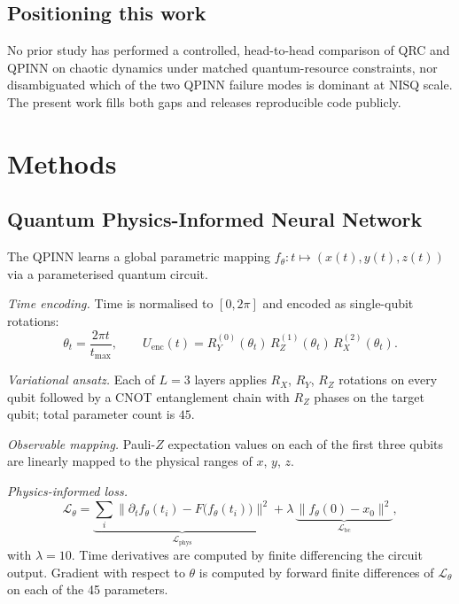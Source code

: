 \documentclass[a4paper,12pt]{iopart}
\begin{document}
\subsection{Positioning this work}
No prior study has performed a controlled, head-to-head comparison of
QRC and QPINN on chaotic dynamics under matched quantum-resource
constraints, nor disambiguated which of the two QPINN failure modes is
dominant at NISQ scale. The present work fills both gaps and releases
reproducible code publicly.

\section{Methods}

\subsection{Quantum Physics-Informed Neural Network}

The QPINN learns a global parametric mapping
$f_\theta : t \mapsto (x(t), y(t), z(t))$ via a parameterised quantum
circuit.

\textit{Time encoding.} Time is normalised to $[0, 2\pi]$ and encoded
as single-qubit rotations:
\begin{equation}
  \theta_t = \frac{2\pi t}{t_{\max}}, \qquad
  U_{\mathrm{enc}}(t) = R_Y^{(0)}(\theta_t)\, R_Z^{(1)}(\theta_t)\, R_X^{(2)}(\theta_t).
\end{equation}

\textit{Variational ansatz.} Each of $L = 3$ layers applies $R_X$,
$R_Y$, $R_Z$ rotations on every qubit followed by a CNOT entanglement
chain with $R_Z$ phases on the target qubit; total parameter count is
$45$.

\textit{Observable mapping.} Pauli-$Z$ expectation values on each of
the first three qubits are linearly mapped to the physical ranges of
$x$, $y$, $z$.

\textit{Physics-informed loss.}
\begin{equation}
  \mathcal{L}_\theta =
  \underbrace{\sum_i \big\| \partial_t f_\theta(t_i) - F\big(f_\theta(t_i)\big) \big\|^2}_{\mathcal{L}_{\mathrm{phys}}}
  + \lambda \, \underbrace{\big\| f_\theta(0) - x_0 \big\|^2}_{\mathcal{L}_{\mathrm{bc}}},
\end{equation}
with $\lambda = 10$. Time derivatives are computed by finite
differencing the circuit output. Gradient with respect to $\theta$ is
computed by forward finite differences of $\mathcal{L}_\theta$ on each
of the 45 parameters.
\end{document}
